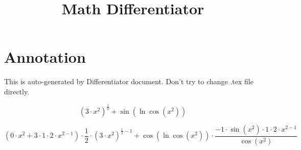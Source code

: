 \documentclass{article}
\title{\textbf{Math Differentiator}}
\date{}
\author{\text{Kaplin Artyom, B01-402}}
\begin{document}
\maketitle
\section*{Annotation}
This is auto-generated by Differentiator document. Don't try to change .tex file directly.

\[\left({3}{\cdot}{x}^{{2}}\right)^{\frac{{1}}{{2}}}{+}\sin{\left(\ln{\cos{\left({x}^{{2}}\right)}}\right)}\]

\[\left({0}{\cdot}{x}^{{2}}{+}{3}{\cdot}{1}{\cdot}{2}{\cdot}{x}^{{2}{-}{1}}\right){\cdot}\frac{{1}}{{2}}{\cdot}\left({3}{\cdot}{x}^{{2}}\right)^{\frac{{1}}{{2}}{-}{1}}{+}\cos{\left(\ln{\cos{\left({x}^{{2}}\right)}}\right)}{\cdot}\frac{{-1}{\cdot}\sin{\left({x}^{{2}}\right)}{\cdot}{1}{\cdot}{2}{\cdot}{x}^{{2}{-}{1}}}{\cos{\left({x}^{{2}}\right)}}\]
\end{document}
